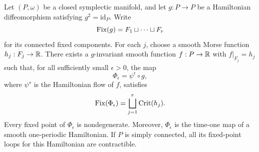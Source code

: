 \begin{proposition}\label{prop:involution}
Let $(P,\omega)$ be a closed symplectic manifold, and let $g:P\to P$ be a
Hamiltonian diffeomorphism satisfying $g^2=\mathrm{id}_P$.  Write
\[
  \operatorname{Fix}(g)=F_1\sqcup\cdots\sqcup F_r
\]
for its connected fixed components.  For each $j$, choose a smooth Morse
function $h_j:F_j\to\mathbb R$.  There exists a $g$-invariant smooth function
$f:P\to\mathbb R$ with $f|_{F_j}=h_j$ such that, for all sufficiently small
$\epsilon>0$, the map
\[
  \Phi_\epsilon=\psi^\epsilon\circ g,
\]
where $\psi^s$ is the Hamiltonian flow of $f$, satisfies
\begin{equation}\label{eq:involution-fixed-set}
  \operatorname{Fix}(\Phi_\epsilon)
    =\bigsqcup_{j=1}^r\operatorname{Crit}(h_j).
\end{equation}
Every fixed point of $\Phi_\epsilon$ is nondegenerate.  Moreover,
$\Phi_\epsilon$ is the time-one map of a smooth one-periodic Hamiltonian.
If $P$ is simply connected, all its fixed-point loops for this Hamiltonian
are contractible.
\end{proposition}

